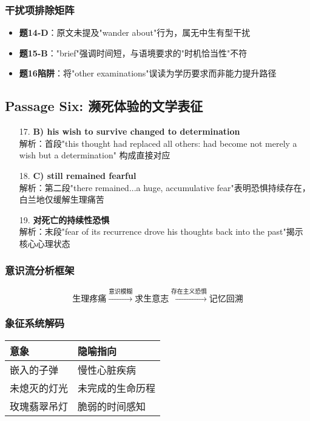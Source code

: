 \documentclass{article}
\begin{document}
\subsubsection*{干扰项排除矩阵}
\begin{itemize}
    \item \textbf{题14-D}：原文未提及"wander about"行为，属无中生有型干扰
    \item \textbf{题15-B}："brief"强调时间短，与语境要求的"时机恰当性"不符
    \item \textbf{题16陷阱}：将"other examinations"误读为学历要求而非能力提升路径
\end{itemize}

\subsection*{Passage Six: 濒死体验的文学表征}
\begin{enumerate}
    \item[17.] \textbf{B) his wish to survive changed to determination} \\ 
    解析：首段"this thought had replaced all others: had become not merely a wish but a determination" 构成直接对应
    
    \item[18.] \textbf{C) still remained fearful} \\ 
    解析：第二段"there remained...a huge, accumulative fear"表明恐惧持续存在，白兰地仅缓解生理痛苦
    
    \item[19.] \textbf{对死亡的持续性恐惧} \\ 
    解析：末段"fear of its recurrence drove his thoughts back into the past"揭示核心心理状态
\end{enumerate}

\subsubsection*{意识流分析框架}
\[
\text{生理疼痛} \xrightarrow{\text{意识模糊}} 
\text{求生意志} \xrightarrow{\text{存在主义恐惧}} 
\text{记忆回溯}
\]

\subsubsection*{象征系统解码}
\begin{tabular}{|l|l|}
\hline
\textbf{意象} & \textbf{隐喻指向} \\
\hline
嵌入的子弹 & 慢性心脏疾病 \\
未熄灭的灯光 & 未完成的生命历程 \\
玫瑰翡翠吊灯 & 脆弱的时间感知 \\
\hline
\end{tabular}
\end{document}
